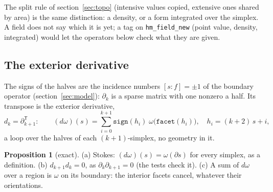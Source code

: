 \documentclass[10pt,a4paper]{article}
\theoremstyle{definition}
\newtheorem{proposition}{Proposition}
\newcommand{\fn}[1]{\texttt{#1}}
\begin{document}
The split rule of section~\ref{sec:topo} (intensive values copied,
extensive ones shared by area) is the same distinction: a density, or a
form integrated over the simplex. A field does not say which it is yet; a
tag on \fn{hm\_field\_new} (point value, density, integrated) would let
the operators below check what they are given.

\subsection{The exterior derivative}

The signs of the halves are the incidence numbers $[s : f] = \pm 1$ of
the boundary operator (section~\ref{sec:model}): $\partial_k$ is a sparse
matrix with one nonzero a half. Its transpose is the exterior derivative,
\[
  d_k = \partial_{k+1}^{\mathsf T}: \qquad
  (d\omega)(s) = \sum_{i=0}^{k+1} \fn{sign}(h_i)\;
    \omega\big(\fn{facet}(h_i)\big), \quad h_i = (k+2)\,s + i,
\]
a loop over the halves of each $(k+1)$-simplex, no geometry in it.

\begin{proposition}[exact]
  (a) Stokes: $(d\omega)(s) = \omega(\partial s)$ for every simplex, as a
  definition. (b) $d_{k+1} d_k = 0$, as $\partial_k \partial_{k+1} = 0$
  (the tests check it). (c) A sum of $d\omega$ over a region is $\omega$ on
  its boundary: the interior facets cancel, whatever their orientations.
\end{proposition}
\end{document}
